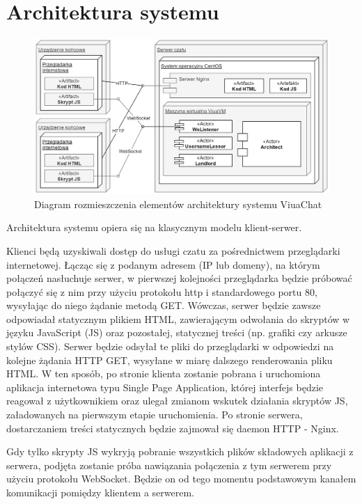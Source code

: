 \section{Architektura systemu}
\label{chat_architektura_systemu}

\begin{figure}[!htp]
	\centering
	\includegraphics[width=\textwidth]{chat/fig/deploy-diag}
	\caption{Diagram rozmieszczenia elementów architektury systemu ViuaChat}
	\label{deploy-diag}
\end{figure}

Architektura systemu opiera się na klasycznym modelu klient-serwer.

Klienci będą uzyskiwali dostęp do usługi czatu za pośrednictwem przeglądarki
internetowej. Łącząc się z podanym adresem (IP lub domeny), na którym połączeń
nasłuchuje serwer, w pierwszej kolejności przeglądarka będzie próbować połączyć
się z nim przy użyciu protokołu http i standardowego portu 80, wysyłając do
niego żądanie metodą GET. Wówczas, serwer będzie zawsze odpowiadał statycznym
plikiem HTML, zawierającym odwołania do skryptów w języku JavaScript (JS) oraz
pozostałej, statycznej treści (np. grafiki czy arkusze stylów CSS). Serwer
będzie odsyłał te pliki do przeglądarki w odpowiedzi na kolejne żądania HTTP
GET, wysyłane w miarę dalszego renderowania pliku HTML. W ten sposób, po
stronie klienta zostanie pobrana i uruchomiona aplikacja internetowa typu
Single Page
Application, której interfejs będzie reagował z użytkownikiem oraz ulegał
zmianom wskutek działania skryptów JS, załadowanych na pierwszym etapie
uruchomienia. Po stronie serwera, dostarczaniem treści statycznych będzie
zajmował się daemon HTTP - Nginx.

Gdy tylko skrypty JS wykryją pobranie wszystkich plików składowych aplikacji
z serwera, podjęta zostanie próba nawiązania połączenia z tym serwerem przy
użyciu protokołu WebSocket. Będzie on od tego momentu podstawowym kanałem
komunikacji pomiędzy klientem a serwerem.


